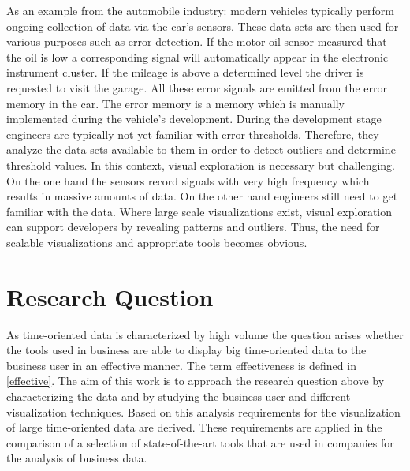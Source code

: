 \par 
As an example from the automobile industry: modern  vehicles typically perform ongoing collection of data via the car's sensors. These data sets are then used for various purposes such as error detection. If the motor oil sensor measured that the oil is low a corresponding signal will automatically appear in the electronic instrument cluster. If the mileage is above a determined level the driver is requested to visit the garage. All these error signals are emitted from the error memory in the car. The error memory is a memory which is manually implemented during the vehicle's development. During the development stage engineers are typically not yet familiar with error thresholds. Therefore, they analyze the data sets available to them in order to detect outliers and determine threshold values. In this context,  visual exploration is necessary but challenging. On the one hand the sensors record signals with very high frequency which results in massive amounts of data. On the other hand engineers still need to get familiar with the data. Where large scale visualizations exist, visual exploration can support developers by revealing patterns and outliers. Thus,  the need for scalable visualizations and appropriate tools becomes obvious. 


\section{Research Question}
As time-oriented data is characterized by high volume the question arises whether the tools used in business are able to display big time-oriented data to the business user in an effective manner. The term effectiveness is defined in \ref{effective}. The aim of this work is to approach the research question above by characterizing the data and by studying the business user and different visualization techniques. Based on this analysis requirements for the visualization of large time-oriented data are derived. These requirements are applied in the comparison of a selection of state-of-the-art tools that are used in companies for the analysis of business data.



